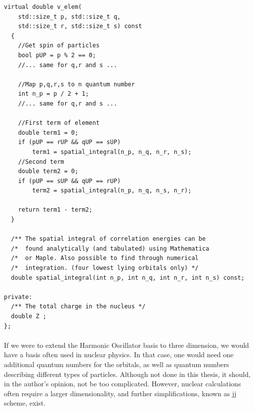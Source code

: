\begin{lstlisting}[float,label={lst:qDots:atoms_p2},caption={Continuation of listing~\ref{lst:qDots:atoms_p1}.},name={lst:qDots:atoms}]
  virtual double v_elem(
    std::size_t p, std::size_t q,
    std::size_t r, std::size_t s) const
  {
    //Get spin of particles
    bool pUP = p % 2 == 0;
	//... same for q,r and s ...

    //Map p,q,r,s to n quantum number
    int n_p = p / 2 + 1;
    //... same for q,r and s ...

    //First term of element
    double term1 = 0;
    if (pUP == rUP && qUP == sUP)
        term1 = spatial_integral(n_p, n_q, n_r, n_s);
    //Second term
    double term2 = 0;
    if (pUP == sUP && qUP == rUP)
        term2 = spatial_integral(n_p, n_q, n_s, n_r);
	
    return term1 - term2;
  }

  /** The spatial integral of correlation energies can be
  /*  found analytically (and tabulated) using Mathematica
  /*  or Maple. Also possible to find through numerical
  /*  integration. (four lowest lying orbitals only) */
  double spatial_integral(int n_p, int n_q, int n_r, int n_s) const;
            
private:
  /** The total charge in the nucleus */
  double Z ;
};
\end{lstlisting}


\paragraph{}
If we were to extend the Harmonic Oscillator basis to three dimension, we would have a basis often used in nuclear physics. 
In that case, one would need one additional quantum numbers for the orbitals, as well as quantum numbers describing different types of particles.
Although not done in this thesis, it should, in the author's opinion, not be too complicated.
However, nuclear calculations often require a larger dimensionality, and further simplifications, known as jj scheme, exist.

